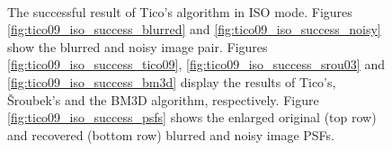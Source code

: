 \documentclass[12pt,notitlepage]{report}
\begin{document}
\begin{figure}[t]
	  ~
	  ~
  \caption[The successful result of Tico's algorithm in ISO mode]{The successful result of Tico's algorithm in ISO mode. Figures \ref{fig:tico09_iso_success_blurred} and \ref{fig:tico09_iso_success_noisy} show the blurred and noisy image pair. Figures \ref{fig:tico09_iso_success_tico09}, \ref{fig:tico09_iso_success_srou03} and \ref{fig:tico09_iso_success_bm3d} display the results of Tico's, Šroubek's and the BM3D algorithm, respectively. Figure \ref{fig:tico09_iso_success_psfs} shows the enlarged original (top row) and recovered (bottom row) blurred and noisy image PSFs.}
  \label{fig:tico09_iso_success}
\end{figure}
\end{document}
